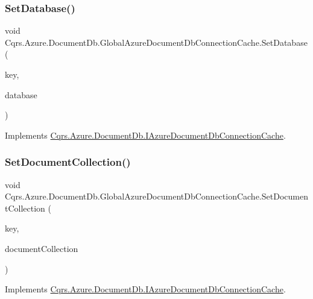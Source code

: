 \subsubsection{\texorpdfstring{Set\+Database()}{SetDatabase()}}
{\footnotesize\ttfamily void Cqrs.\+Azure.\+Document\+Db.\+Global\+Azure\+Document\+Db\+Connection\+Cache.\+Set\+Database (\begin{DoxyParamCaption}\item[{string}]{key,  }\item[{Database}]{database }\end{DoxyParamCaption})}



Implements \hyperlink{interfaceCqrs_1_1Azure_1_1DocumentDb_1_1IAzureDocumentDbConnectionCache_a9242c99ffb76f8ad9b15cab617056bf0}{Cqrs.\+Azure.\+Document\+Db.\+I\+Azure\+Document\+Db\+Connection\+Cache}.

\mbox{\label{classCqrs_1_1Azure_1_1DocumentDb_1_1GlobalAzureDocumentDbConnectionCache_a19c4bcbf0149036557fb8a3a3b687c79}} 
\subsubsection{\texorpdfstring{Set\+Document\+Collection()}{SetDocumentCollection()}}
{\footnotesize\ttfamily void Cqrs.\+Azure.\+Document\+Db.\+Global\+Azure\+Document\+Db\+Connection\+Cache.\+Set\+Document\+Collection (\begin{DoxyParamCaption}\item[{string}]{key,  }\item[{Document\+Collection}]{document\+Collection }\end{DoxyParamCaption})}



Implements \hyperlink{interfaceCqrs_1_1Azure_1_1DocumentDb_1_1IAzureDocumentDbConnectionCache_a6f5dab93f2ebee2503eb808b9031777d}{Cqrs.\+Azure.\+Document\+Db.\+I\+Azure\+Document\+Db\+Connection\+Cache}.

